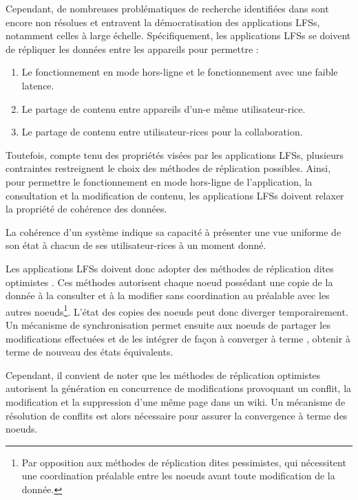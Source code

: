 Cependant, de nombreuses problématiques de recherche identifiées dans \cite{localfirstsoftware2019} sont encore non résolues et entravent la démocratisation des applications \acp{LFS}, notamment celles à large échelle.
Spécifiquement, les applications \acp{LFS} se doivent de répliquer les données entre les appareils pour permettre :
\begin{enumerate}
  \item Le fonctionnement en mode hors-ligne et le fonctionnement avec une faible latence.
  \item Le partage de contenu entre appareils d'un-e même utilisateur-rice.
  \item Le partage de contenu entre utilisateur-rices pour la collaboration.
\end{enumerate}

Toutefois, compte tenu des propriétés visées par les applications \acp{LFS}, plusieurs contraintes restreignent le choix des méthodes de réplication possibles.
Ainsi, pour permettre le fonctionnement en mode hors-ligne de l'application, \ie la consultation et la modification de contenu, les applications \acp{LFS} doivent relaxer la propriété de cohérence des données.
\begin{definition}[Cohérence]
  La cohérence d'un système indique sa capacité à présenter une vue uniforme de son état à chacun de ses utilisateur-rices à un moment donné.
\end{definition}

Les applications \acp{LFS} doivent donc adopter des méthodes de réplication dites optimistes \cite{2005-optimistic-replication-saito}.
Ces méthodes autorisent chaque noeud possédant une copie de la donnée à la consulter et à la modifier sans coordination au préalable avec les autres noeuds\footnote{Par opposition aux méthodes de réplication dites pessimistes, qui nécessitent une coordination préalable entre les noeuds avant toute modification de la donnée.}.
L'état des copies des noeuds peut donc diverger temporairement.
Un mécanisme de synchronisation permet ensuite aux noeuds de partager les modifications effectuées et de les intégrer de façon à converger à terme \cite{10.1145/224057.224070}, \ie obtenir à terme de nouveau des états équivalents.

Cependant, il convient de noter que les méthodes de réplication optimistes autorisent la génération en concurrence de modifications provoquant un conflit, \eg la modification et la suppression d'une même page dans un wiki.
Un mécanisme de résolution de conflits est alors nécessaire pour assurer la convergence à terme des noeuds.

